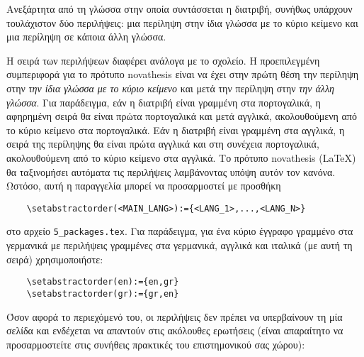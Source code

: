 
%


Ανεξάρτητα από τη γλώσσα στην οποία συντάσσεται η διατριβή, συνήθως υπάρχουν τουλάχιστον δύο περιλήψεις: μια περίληψη στην ίδια γλώσσα με το κύριο κείμενο και μια περίληψη σε κάποια άλλη γλώσσα.

Η σειρά των περιλήψεων διαφέρει ανάλογα με το σχολείο. Η προεπιλεγμένη συμπεριφορά για το πρότυπο \gls{novathesis} είναι να έχει στην πρώτη θέση την περίληψη στην \emph{την ίδια γλώσσα με το κύριο κείμενο} και μετά την περίληψη στην \emph{την άλλη γλώσσα}. Για παράδειγμα, εάν η διατριβή είναι γραμμένη στα πορτογαλικά, η αφηρημένη σειρά θα είναι πρώτα πορτογαλικά και μετά αγγλικά, ακολουθούμενη από το κύριο κείμενο στα πορτογαλικά. Εάν η διατριβή είναι γραμμένη στα αγγλικά, η σειρά της περίληψης θα είναι πρώτα αγγλικά και στη συνέχεια πορτογαλικά, ακολουθούμενη από το κύριο κείμενο στα αγγλικά.
%
Το πρότυπο \gls{novathesis} (\LaTeX) θα ταξινομήσει αυτόματα τις περιλήψεις λαμβάνοντας υπόψη αυτόν τον κανόνα. Ωστόσο, αυτή η παραγγελία μπορεί να προσαρμοστεί με προσθήκη
\begin{otherlanguage}{english}
\begin{verbatim}
    \setabstractorder(<MAIN_LANG>):={<LANG_1>,...,<LANG_N>}
\end{verbatim}
\end{otherlanguage}
\noindent στο αρχείο \verb!5_packages.tex!. Για παράδειγμα, για ένα κύριο έγγραφο γραμμένο στα γερμανικά με περιλήψεις γραμμένες στα γερμανικά, αγγλικά και ιταλικά (με αυτή τη σειρά) χρησιμοποιήστε:
\begin{otherlanguage}{english}
\begin{verbatim}
    \setabstractorder(en):={en,gr}
    \setabstractorder(gr):={gr,en}
\end{verbatim}
\end{otherlanguage}
Όσον αφορά το περιεχόμενό του, οι περιλήψεις δεν πρέπει να υπερβαίνουν τη μία σελίδα και ενδέχεται να απαντούν στις ακόλουθες ερωτήσεις (είναι απαραίτητο να προσαρμοστείτε στις συνήθεις πρακτικές του επιστημονικού σας χώρου):

